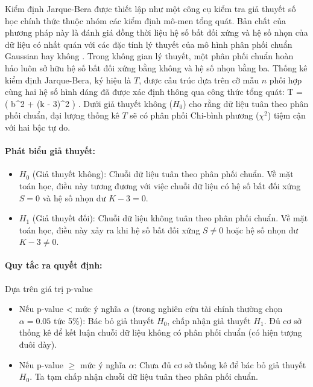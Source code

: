 Kiểm định Jarque-Bera được thiết lập như một công cụ kiểm tra giả thuyết số học chính thức thuộc nhóm các kiểm định mô-men tổng quát. Bản chất của phương pháp này là đánh giá đồng thời liệu hệ số bất đối xứng và hệ số nhọn của dữ liệu có nhất quán với các đặc tính lý thuyết của mô hình phân phối chuẩn Gaussian hay không \cite{arratia2014computational}. Trong không gian lý thuyết, một phân phối chuẩn hoàn hảo luôn sở hữu hệ số bất đối xứng bằng không và hệ số nhọn bằng ba. Thống kê kiểm định Jarque-Bera, ký hiệu là $T$, được cấu trúc dựa trên cỡ mẫu $n$ phối hợp cùng hai hệ số hình dáng đã được xác định thông qua công thức tổng quát:
\bea
T =  \left( b^2 + (k - 3)^2 \right) .
\eea Dưới giả thuyết không ($H_0$) cho rằng dữ liệu tuân theo phân phối chuẩn, đại lượng thống kê $T$ sẽ có phân phối Chi-bình phương ($\chi^2$) tiệm cận với hai bậc tự do.

\paragraph{Phát biểu giả thuyết:}
\begin{itemize}
    \item $H_0$ (Giả thuyết không): Chuỗi dữ liệu tuân theo phân phối chuẩn. Về mặt toán học, điều này tương đương với việc chuỗi dữ liệu có hệ số bất đối xứng $S = 0$ và hệ số nhọn dư $K - 3 = 0$.
    \item $H_1$ (Giả thuyết đối): Chuỗi dữ liệu không tuân theo phân phối chuẩn. Về mặt toán học, điều này xảy ra khi hệ số bất đối xứng $S \neq 0$ hoặc hệ số nhọn dư $K - 3 \neq 0$.
\end{itemize}
\paragraph{Quy tắc ra quyết định:} Dựa trên giá trị p-value
\begin{itemize}
    \item Nếu p-value < mức ý nghĩa $\alpha$ (trong nghiên cứu tài chính thường chọn $\alpha = 0.05$ tức 5\%): Bác bỏ giả thuyết $H_0$, chấp nhận giả thuyết $H_1$. Đủ cơ sở thống kê để kết luận chuỗi dữ liệu không có phân phối chuẩn (có hiện tượng đuôi dày).
    \item Nếu p-value $\ge$ mức ý nghĩa $\alpha$: Chưa đủ cơ sở thống kê để bác bỏ giả thuyết $H_0$. Ta tạm chấp nhận chuỗi dữ liệu tuân theo phân phối chuẩn.
\end{itemize}

